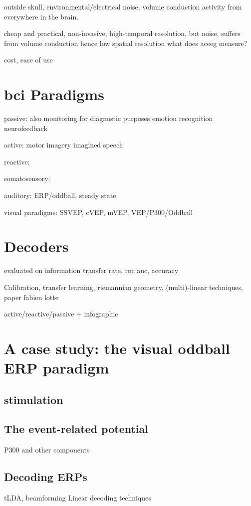 outside skull, environmental/electrical noise, volume conduction activity from
everywhere in the brain.

cheap and practical, non-invasive, high-temporal resolution, but noise, suffers from volume
conduction hence low spatial resolution
what does ac{eeg} measure?

cost, ease of use

\section{\ac{bci} Paradigms}
\label{sec:bci-paradigms}
passive:
also monitoring for diagnostic purposes
emotion recognition
neurofeedback

active:
motor imagery
imagined speech

reactive:

somatosensory:

auditory:
ERP/oddball, steady state


visual paradigms:
SSVEP, cVEP, mVEP, VEP/P300/Oddball

\section{Decoders}
\label{sec:bci-decoders}
evaluated on
information transfer rate,
roc auc,
accuracy

Calibration, transfer learning, riemannian geometry, (multi)-linear techniques,
paper fabien lotte

active/reactive/passive + infographic


\section{A case study: the visual oddball ERP paradigm}
\subsection{stimulation}
\subsection{The event-related potential}
P300 and other components
\subsection{Decoding ERPs}
tLDA, beamforming
Linear decoding techniques
